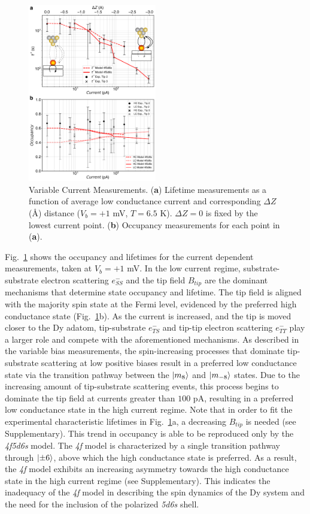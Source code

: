 \documentclass[
reprint,amsmath,amssymb,aps]{revtex4-2}
\begin{document}
\begin{figure}[h!]
\includegraphics[width=0.5\textwidth]{Fig5_new.pdf}
\caption{Variable Current Measurements. (\textbf{a}) Lifetime measurements as a function of average low conductance current and corresponding $\Delta Z$ (\AA) distance ($V_{b} = +1$ mV, $T = 6.5$ K). $\Delta Z = 0$ is fixed by the lowest current point. (\textbf{b}) Occupancy measurements for each point in (\textbf{a}).
\label{fig:current} }
\end{figure}

Fig.~\ref{fig:current} shows the occupancy and lifetimes for the current dependent measurements, taken at $V_{b} = +1$ mV. In the low current regime, substrate-substrate electron scattering $e^{-}_{SS}$ and the tip field $B_{tip}$ are the dominant mechanisms that determine state occupancy and lifetime. The tip field is aligned with the majority spin state at the Fermi level, evidenced by the preferred high conductance state (Fig.~\ref{fig:current}b). As the current is increased, and the tip is moved closer to the Dy adatom, tip-substrate $e^{-}_{TS}$ and tip-tip electron scattering $e^{-}_{TT}$ play a larger role and compete with the aforementioned mechanisms. As described in the variable bias measurements, the spin-increasing processes that dominate tip-substrate scattering at low positive biases result in a preferred low conductance state via the transition pathway between the $\ket{m_{8}}$ and $\ket{m_{-8}}$ states. Due to the increasing amount of tip-substrate scattering events, this process begins to dominate the tip field at currents greater than $100$ pA, resulting in a preferred low conductance state in the high current regime. Note that in order to fit the experimental characteristic lifetimes in Fig.~\ref{fig:current}a, a decreasing $B_{tip}$ is needed (see Supplementary).
This trend in occupancy is able to be reproduced only by the \textit{4f5d6s} model. The \textit{4f} model is characterized by a single transition pathway through $\ket{\pm 6}$, above which the high conductance state is preferred. As a result, the \textit{4f} model exhibits an increasing asymmetry towards the high conductance state in the high current regime (see Supplementary). This indicates the inadequacy of the \textit{4f} model in describing the spin dynamics of the Dy system and the need for the inclusion of the polarized \textit{5d6s} shell. 




\end{document}
